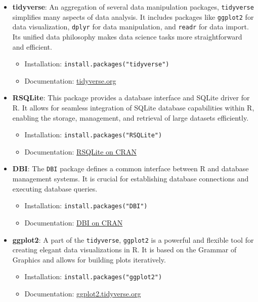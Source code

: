 \documentclass[11pt]{article}\usepackage[]{graphicx}\usepackage[]{xcolor}
\begin{document}
\begin{itemize}
    \item \textbf{tidyverse}: An aggregation of several data manipulation packages, \texttt{tidyverse} simplifies many aspects of data analysis. It includes packages like \texttt{ggplot2} for data visualization, \texttt{dplyr} for data manipulation, and \texttt{readr} for data import. Its unified data philosophy makes data science tasks more straightforward and efficient.
    \begin{itemize}
        \item Installation: \texttt{install.packages("tidyverse")}
        \item Documentation: \href{https://www.tidyverse.org/}{tidyverse.org}
    \end{itemize}
    
    \item \textbf{RSQLite}: This package provides a database interface and SQLite driver for R. It allows for seamless integration of SQLite database capabilities within R, enabling the storage, management, and retrieval of large datasets efficiently.
    \begin{itemize}
        \item Installation: \texttt{install.packages("RSQLite")}
        \item Documentation: \href{https://cran.r-project.org/web/packages/RSQLite/index.html}{RSQLite on CRAN}
    \end{itemize}
    
    \item \textbf{DBI}: The \texttt{DBI} package defines a common interface between R and database management systems. It is crucial for establishing database connections and executing database queries.
    \begin{itemize}
        \item Installation: \texttt{install.packages("DBI")}
        \item Documentation: \href{https://cran.r-project.org/web/packages/DBI/index.html}{DBI on CRAN}
    \end{itemize}
    
    \item \textbf{ggplot2}: A part of the \texttt{tidyverse}, \texttt{ggplot2} is a powerful and flexible tool for creating elegant data visualizations in R. It is based on the Grammar of Graphics and allows for building plots iteratively.
    \begin{itemize}
        \item Installation: \texttt{install.packages("ggplot2")}
        \item Documentation: \href{https://ggplot2.tidyverse.org/}{ggplot2.tidyverse.org}
    \end{itemize}
    

\end{itemize}
\end{document}
